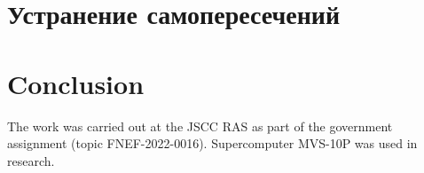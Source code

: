 \documentclass[
11pt,%
tightenlines,%
twoside,%
onecolumn,%
nofloats,%
nobibnotes,%
nofootinbib,%
superscriptaddress,%
noshowpacs,%
centertags]%
{revtex4}
\begin{document}

\section{Устранение самопересечений}



\section{Conclusion}


\begin{acknowledgments}
The work was carried out at the JSCC RAS as part of the government assignment (topic FNEF-2022-0016). Supercomputer MVS-10P was used in research.
\end{acknowledgments}

\end{document}
